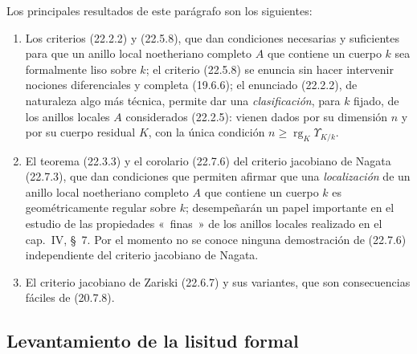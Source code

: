 \documentclass[10pt,oneside]{book}
\newcommand{\oldpage}[2][]{%
  \setcounter{footnote}{0}%
  \marginpar{\scriptsize\textbf{#1}~|~#2}\ignorespaces}
\begin{document}
Los principales resultados de este parágrafo son los siguientes:
\begin{enumerate}
  \item[\textit{a)}] Los criterios (22.2.2) y (22.5.8), que dan condiciones
  necesarias y suficientes para que un anillo local noetheriano completo $A$
  que contiene un cuerpo $k$ sea formalmente liso sobre $k$; el criterio
  (22.5.8) se enuncia sin hacer intervenir nociones diferenciales y completa
  (19.6.6); el enunciado (22.2.2), de naturaleza algo más técnica, permite dar
  una \emph{clasificación}, para $k$ fijado, de los anillos locales $A$
  considerados (22.2.5): vienen dados por su dimensión $n$ y por su cuerpo
  residual $K$, con la única condición
  $n\geqslant\operatorname{rg}_K\Upsilon_{K/k}$.

  \item[\textit{b)}] El teorema (22.3.3) y el corolario (22.7.6) del criterio
  jacobiano de Nagata (22.7.3), que dan condiciones que permiten afirmar que
  una \emph{localización} de un anillo local noetheriano completo $A$ que
  contiene un cuerpo $k$ es geométricamente regular sobre $k$; desempeñarán
  un papel importante en el estudio de las propiedades «~finas~» de los
  anillos locales realizado en el cap.~IV, §~7. Por el momento no se conoce
  ninguna demostración de (22.7.6) independiente del criterio jacobiano de
  Nagata.

  \item[\textit{c)}] El criterio jacobiano de Zariski (22.6.7) y sus variantes, que
  son consecuencias fáciles de (20.7.8).
\end{enumerate}

\oldpage[0\textsubscript{IV-1}]{183}

\subsection{Levantamiento de la lisitud formal}
\label{subsection:0.22.1-es}
\end{document}
